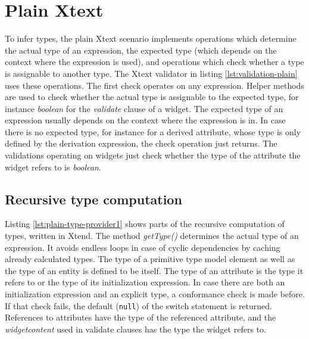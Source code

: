 \section{Plain Xtext}

To infer types, the plain Xtext scenario implements operations which determine the actual type of an expression, the expected type (which depends on the context where the expression is used), and operations which check whether a type is assignable to another type. The Xtext validator in listing \ref{lst:validation-plain} uses these operations. The first check operates on any expression. Helper methods are used to check whether the actual type is assignable to the expected type, for instance \emph{boolean} for the \emph{validate} clause of a widget. The expected type of an expression usually depends on the context where the expression is in. In case there is no expected type, for instance for a derived attribute, whose type is only defined by the derivation expression, the check operation just returns. The validations operating on widgets just check whether the type of the attribute the widget refers to is \emph{boolean}.




\subsection{Recursive type computation}

Listing \ref{lst:plain-type-provider1} shows parts of the recursive computation of types, written in Xtend. The method \emph{getType()} determines the actual type of an expression. It avoids endless loops in case of cyclic dependencies by caching already calculated types. The type of a primitive type model element as well as the type of an entity is defined to be itself. The type of an attribute is the type it refers to or the type of its initialization expression. In case there are both an initialization expression and an explicit type, a conformance check is made before. If that check fails, the default (\verb|null|) of the switch statement is returned. References to attributes have the type of the referenced attribute, and the \emph{widgetcontent} used in validate clauses has the type the widget refers to. %

